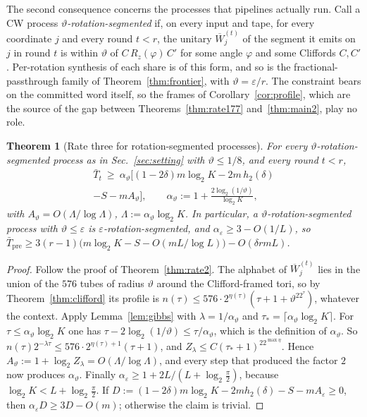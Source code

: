 \documentclass[aps,prx,twocolumn,superscriptaddress,nofootinbib,longbibliography]{revtex4-2}
\theoremstyle{plain}
\newtheorem{theorem}{Theorem}
\theoremstyle{definition}
\theoremstyle{remark}
\newcommand{\Tpre}{T_{\mathrm{pre}}}
\begin{document}
The second consequence concerns the processes that pipelines actually run. Call a CW process \emph{$\vartheta$-rotation-segmented} if, on every input and tape, for every coordinate $j$ and every round $t<r$, the unitary $\overline W^{(t)}_j$ of the segment it emits on $j$ in round $t$ is within $\vartheta$ of $C\,R_z(\varphi)\,C'$ for some angle $\varphi$ and some Cliffords $C,C'$. Per-rotation synthesis of each share is of this form, and so is the fractional-passthrough family of Theorem~\ref{thm:frontier}, with $\vartheta=\varepsilon/r$. The constraint bears on the committed word itself, so the frames of Corollary~\ref{cor:profile}, which are the source of the gap between Theorems~\ref{thm:rate177} and~\ref{thm:main2}, play no role.

\begin{theorem}[Rate three for rotation-segmented processes]\label{thm:rate3seg}
For every $\vartheta$-rotation-segmented process as in Sec.~\ref{sec:setting} with $\vartheta\le1/8$, and every round $t<r$,
\begin{multline}\label{eq:rate3seg}
\bar T_t\ \ge\ \alpha_\vartheta\big[(1-2\delta)m\log_2K-2m\,h_2(\delta)\\-S-mA_\vartheta\big],\qquad\alpha_\vartheta:=1+\frac{2\log_2(1/\vartheta)}{\log_2K},
\end{multline}
with $A_\vartheta=O(\Lambda/\log\Lambda)$, $\Lambda:=\alpha_\vartheta\log_2K$. In particular, a $\vartheta$-rotation-segmented process with $\vartheta\le\varepsilon$ is $\varepsilon$-rotation-segmented, and $\alpha_\varepsilon\ge3-O(1/L)$, so $\bar\Tpre\ge3(r-1)\big(m\log_2K-S-O(mL/\log L)\big)-O(\delta rmL)$.
\end{theorem}
\begin{proof}
Follow the proof of Theorem~\ref{thm:rate2}. The alphabet of $\overline W^{(t)}_j$ lies in the union of the $576$ tubes of radius $\vartheta$ around the Clifford-framed tori, so by Theorem~\ref{thm:clifford} its profile is $n(\tau)\le576\cdot2^{\eta(\tau)}(\tau+1+\vartheta^22^\tau)$, whatever the context. Apply Lemma~\ref{lem:gibbs} with $\lambda=1/\alpha_\vartheta$ and $\tau_*=\lceil\alpha_\vartheta\log_2K\rceil$. For $\tau\le\alpha_\vartheta\log_2K$ one has $\tau-2\log_2(1/\vartheta)\le\tau/\alpha_\vartheta$, which is the definition of $\alpha_\vartheta$. So $n(\tau)2^{-\lambda\tau}\le576\cdot2^{\eta(\tau)+1}(\tau+1)$, and $Z_\lambda\le C(\tau_*+1)^22^{\max\eta}$. Hence $A_\vartheta:=1+\log_2Z_\lambda=O(\Lambda/\log\Lambda)$, and every step that produced the factor $2$ now produces $\alpha_\vartheta$. Finally $\alpha_\varepsilon\ge1+2L/(L+\log_2\frac\pi2)$, because $\log_2K<L+\log_2\frac\pi2$. If $D:=(1-2\delta)m\log_2K-2mh_2(\delta)-S-mA_\varepsilon\ge0$, then $\alpha_\varepsilon D\ge3D-O(m)$; otherwise the claim is trivial.
\end{proof}
\end{document}
